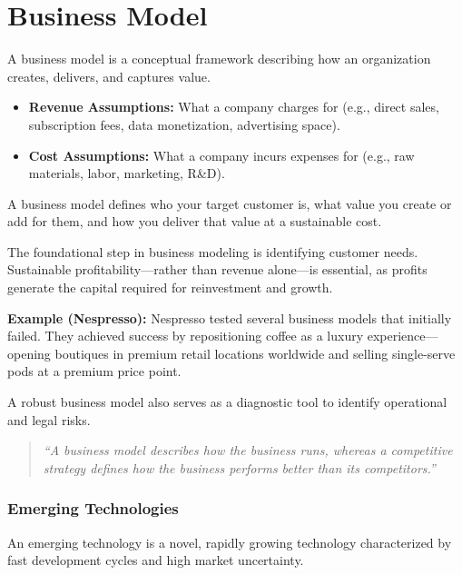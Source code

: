 \documentclass[12pt,a4paper]{report}
\begin{document}
\chapter{Business Model}

A business model is a conceptual framework describing how an organization creates, delivers, and captures value.

\begin{itemize}
    \item \textbf{Revenue Assumptions:} What a company charges for (e.g., direct sales, subscription fees, data monetization, advertising space).
    \item \textbf{Cost Assumptions:} What a company incurs expenses for (e.g., raw materials, labor, marketing, R\&D).
\end{itemize}

\begin{keybox}
A business model defines who your target customer is, what value you create or add for them, and how you deliver that value at a sustainable cost.
\end{keybox}

The foundational step in business modeling is identifying customer needs. Sustainable profitability—rather than revenue alone—is essential, as profits generate the capital required for reinvestment and growth.

\textbf{Example (Nespresso):} Nespresso tested several business models that initially failed. They achieved success by repositioning coffee as a luxury experience—opening boutiques in premium retail locations worldwide and selling single-serve pods at a premium price point.

A robust business model also serves as a diagnostic tool to identify operational and legal risks.

\begin{quote}
\textit{``A business model describes how the business runs, whereas a competitive strategy defines how the business performs better than its competitors.''}
\end{quote}

\subsection{Emerging Technologies}

An emerging technology is a novel, rapidly growing technology characterized by fast development cycles and high market uncertainty.
\end{document}
